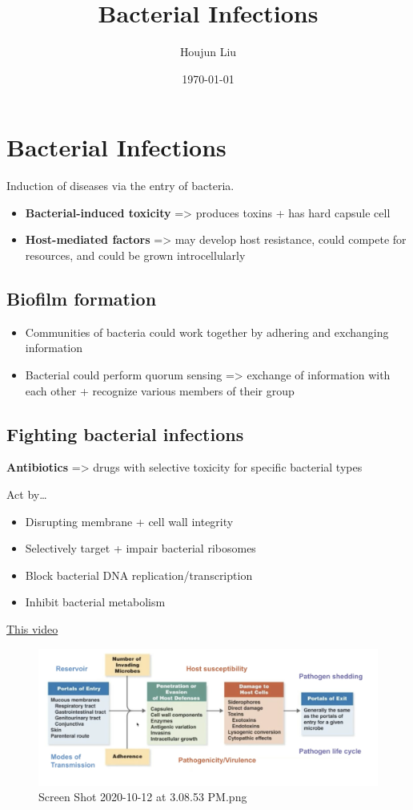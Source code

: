 \documentclass[letterpaper]{article}
\author{Houjun Liu}
\date{\today}
\title{Bacterial Infections}
\renewcommand{\tableofcontents}{}
\begin{document}
\tableofcontents



\section{Bacterial Infections}
\label{sec:org88342ca}
Induction of diseases via the entry of bacteria.

\begin{itemize}
\item \textbf{Bacterial-induced toxicity} => produces toxins + has hard capsule
cell
\item \textbf{Host-mediated factors} => may develop host resistance, could compete
for resources, and could be grown introcellularly
\end{itemize}

\subsection{Biofilm formation}
\label{sec:orga91c23a}
\begin{itemize}
\item Communities of bacteria could work together by adhering and exchanging
information
\item Bacterial could perform quorum sensing => exchange of information with
each other + recognize various members of their group
\end{itemize}

\subsection{Fighting bacterial infections}
\label{sec:org1f356e6}
\textbf{Antibiotics} => drugs with selective toxicity for specific bacterial
types

Act by\ldots{}

\begin{itemize}
\item Disrupting membrane + cell wall integrity
\item Selectively target + impair bacterial ribosomes
\item Block bacterial DNA replication/transcription
\item Inhibit bacterial metabolism
\end{itemize}

\href{https://drive.google.com/file/d/1WRnbgkhnmRrdP4ZqlqT3HHBD1\_eW9qib/view}{This
video}

\begin{figure}[htbp]
\centering
\includegraphics[width=.9\linewidth]{Screen Shot 2020-10-12 at 3.08.53 PM.png}
\caption{Screen Shot 2020-10-12 at 3.08.53 PM.png}
\end{figure}
\end{document}
